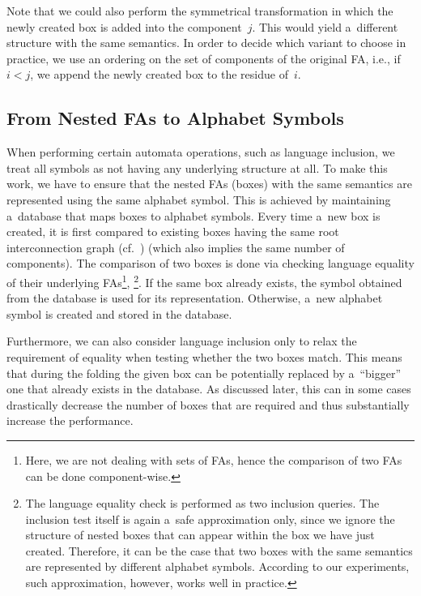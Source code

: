 {Note that we could also perform the symmetrical transformation in which the newly created
box is added into the component~$j$. This would yield a~different structure with the same
semantics. In order to decide which variant to choose in practice, we use an ordering on
the set of components of the original FA, i.e., if $i < j$, we append the newly created
box to the residue of~$i$.

\subsection{From Nested FAs to Alphabet Symbols}

When performing certain automata operations,
such as language inclusion, we treat all symbols as not having any underlying
structure at all.
To make this work, we have to ensure that the nested FAs (boxes) with the same
semantics are represented using the same alphabet symbol.
This is achieved by maintaining
a~database that maps boxes to alphabet symbols. Every time a~new box is created, it is
first compared to existing boxes having the same root interconnection graph (cf.\ ) (which also
implies the same number of components).
The comparison of two boxes is done via checking
language equality of their underlying FAs\footnote{
Here, we are not dealing with sets of FAs, hence the comparison of two FAs can
be done component-wise.
}, \footnote{The language equality check is performed as two inclusion queries.
The inclusion test itself is again a~safe approximation only, since we ignore the structure
of nested boxes that can appear within the box we have just created. Therefore,
it can be the case that two boxes with the same semantics are represented by different
alphabet symbols. According to our experiments, such approximation, however,
works well in practice.
}.
If the same box already exists, the symbol obtained from the database is used for its
representation. Otherwise, a~new alphabet symbol is created and
stored in the database.

Furthermore, we can also consider language inclusion only to relax the requirement of
equality when testing whether the two boxes match. This means that during the folding the
given box can be potentially replaced by a~``bigger'' one that already exists in the
database. As discussed later, this can in some cases drastically decrease the number of
boxes that are required and thus substantially increase the performance.

}
